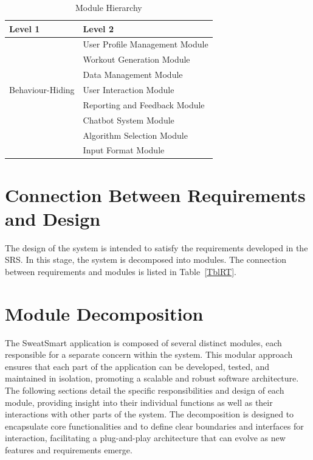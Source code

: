 \documentclass[12pt, titlepage]{article}
\begin{document}
\begin{table}[h!]
\centering
\begin{tabular}{p{} p{}}
\toprule
\textbf{Level 1} & \textbf{Level 2}\\
\midrule


\multirow{7}{0.3\textwidth}{Behaviour-Hiding} & User Profile Management Module\\
& Workout Generation Module\\
& Data Management Module\\
& User Interaction Module\\ 
& Reporting and Feedback Module\\
& Chatbot System Module\\
\midrule

\multirow{3}{0.3\textwidth}{Software Decision} & Algorithm Selection Module\\
& Input Format Module\\
\bottomrule

\end{tabular}
\caption{Module Hierarchy}
\label{TblMH}
\end{table}


\section{Connection Between Requirements and Design} \label{SecConnection}

The design of the system is intended to satisfy the requirements developed in
the SRS. In this stage, the system is decomposed into modules. The connection
between requirements and modules is listed in Table~\ref{TblRT}.

\setlength{\parindent}{0cm}
\section{Module Decomposition} \label{SecMD}

The SweatSmart application is composed of several distinct modules, each responsible for a separate concern within the system. This modular approach ensures that each part of the application can be developed, tested, and maintained in isolation, promoting a scalable and robust software architecture. \\

The following sections detail the specific responsibilities and design of each module, providing insight into their individual functions as well as their interactions with other parts of the system. The decomposition is designed to encapsulate core functionalities and to define clear boundaries and interfaces for interaction, facilitating a plug-and-play architecture that can evolve as new features and requirements emerge.\\
\end{document}
